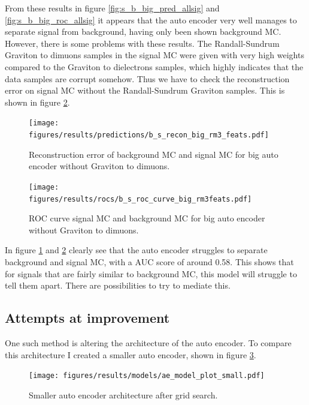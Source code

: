\documentclass[ reprint, amsmath,amssymb, aps, nofootinbib]{revtex4-2}
\begin{document}
From these results in figure \ref{fig:s_b_big_pred_allsig} and \ref{fig:s_b_big_roc_allsig} it appears that the auto encoder very well manages to separate signal from background, having only been shown background MC. However, there is some problems with these results. The Randall-Sundrum Graviton to dimuons samples in the signal MC were given with very high weights compared to the Graviton to dielectrons samples, which highly indicates that the data samples are corrupt somehow. Thus we have to check the reconstruction error on signal MC without the Randall-Sundrum Graviton samples. This is shown in figure \ref{fig:roc_sig_big_allsig_nogmumu}.


\begin{figure}[H]    
     \centering
    \texttt{[image: figures/results/predictions/b\_s\_recon\_big\_rm3\_feats.pdf]}
    \caption{Reconstruction error of background MC and signal MC for big auto encoder without Graviton to dimuons.  }
    \label{fig:s_b_big_allsig_nogmumu}
\end{figure}

\begin{figure}[H]    
  \centering
         \texttt{[image: figures/results/rocs/b\_s\_roc\_curve\_big\_rm3feats.pdf]}
         \caption{ROC curve signal MC and background MC for big auto encoder without Graviton to dimuons. }
         \label{fig:roc_sig_big_allsig_nogmumu}
\end{figure}


In figure \ref{fig:s_b_big_allsig_nogmumu} and \ref{fig:roc_sig_big_allsig_nogmumu} clearly see that the auto encoder struggles to separate background and signal MC, with a AUC score of around 0.58. This shows that for signals that are fairly similar to background MC, this model will struggle to tell them apart. There are possibilities to try to mediate this. 

\subsection{Attempts at improvement}

One such method is altering the architecture of the auto encoder. To compare this architecture I created a smaller auto encoder, shown in figure \ref{fig:small_ae_plot}.

\begin{figure}[H]
    \centering
    \texttt{[image: figures/results/models/ae\_model\_plot\_small.pdf]}
    \caption{Smaller auto encoder architecture after grid search. }
    \label{fig:small_ae_plot}
\end{figure}
\end{document}
